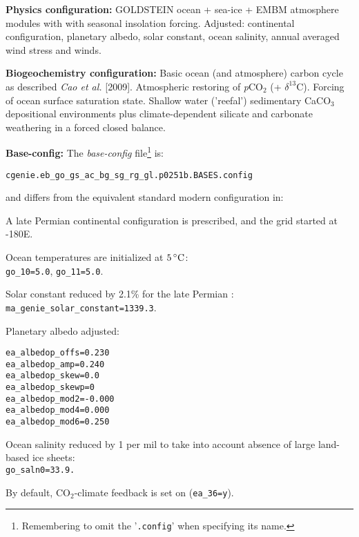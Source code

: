 \documentclass[10pt,twoside]{article}
\begin{document}
\noindent \textbf{Physics configuration:} GOLDSTEIN ocean + sea-ice + EMBM atmosphere modules with with seasonal insolation forcing. Adjusted: continental configuration, planetary albedo, solar constant, ocean salinity, annual averaged wind stress and winds.

\noindent \textbf{Biogeochemistry configuration:} Basic ocean (and atmosphere) carbon cycle as described \textit{Cao et al.} [2009]. Atmospheric restoring of \textit{p}CO\(_{2}\) (+ $\delta^{13}$C). Forcing of ocean surface saturation state. Shallow water ('reefal') sedimentary CaCO$_{3}$ depositional environments plus climate-dependent silicate and carbonate weathering in a forced closed balance.

\noindent \textbf{Base-config:} The \textit{base-config} file\footnote{Remembering to omit the '\texttt{.config}' when specifying its name.} is:
\vspace{-10pt}\begin{verbatim}cgenie.eb_go_gs_ac_bg_sg_rg_gl.p0251b.BASES.config\end{verbatim}\vspace{-10pt}
and differs from the equivalent standard modern configuration in:
        \begin{compactitem}
        \item A late Permian continental configuration is prescribed, and the grid started at -180E.
                \item Ocean temperatures are initialized at $5\,^{\circ}{\rm C}$:
                \\ \texttt{go\_10=5.0}, \texttt{go\_11=5.0}.
                \item Solar constant reduced by 2.1\% for the late Permian      :
                \\ \texttt{ma\_genie\_solar\_constant=1339.3}.
                \item Planetary albedo adjusted:
                \vspace{-5pt}\begin{verbatim}
ea_albedop_offs=0.230
ea_albedop_amp=0.240
ea_albedop_skew=0.0
ea_albedop_skewp=0
ea_albedop_mod2=-0.000
ea_albedop_mod4=0.000
ea_albedop_mod6=0.250
\end{verbatim}\vspace{-5pt}
\item Ocean salinity reduced by 1 per mil to take into account absence of large land-based ice sheets:
\\ \texttt{go\_saln0=33.9.}
\item By default, CO$_{2}$-climate feedback is set on (\texttt{ea\_36=y}).
        \end{compactitem}
\end{document}
